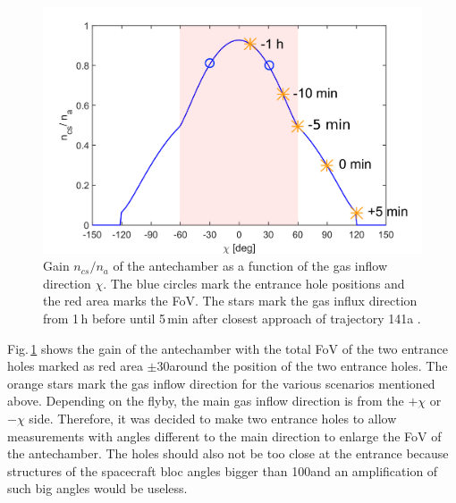 		\begin{figure}[h!]
			\centering
			\includegraphics[width=.8\textwidth]{Bilder/Chi_theta0_flyby.png}
			\caption{Gain $n_{cs}/n_a$ of the antechamber as a function of the gas inflow direction $\chi$. The blue circles mark the entrance hole positions and the red area marks the FoV. The stars mark the gas influx direction from 1\,h before until 5\,min after closest approach of trajectory 141a \cite{SOC_Crema3p2}.}
			\label{fig:densEnhChiFlyby}
		\end{figure}
		Fig.\,\ref{fig:densEnhChiFlyby} shows the gain of the antechamber with the total FoV of the two entrance holes marked as red area $\pm$30\degree around the position of the two entrance holes. The orange stars mark the gas inflow direction for the various scenarios mentioned above. Depending on the flyby, the main gas inflow direction is from the $+\chi$ or $-\chi$ side. Therefore, it was decided to make two entrance holes to allow measurements with angles different to the main direction to enlarge the FoV of the antechamber. The holes should also not be too close at the entrance because structures of the spacecraft bloc angles bigger than 100\degree and an amplification of such big angles would be useless.
		
		
